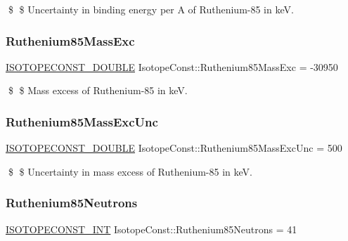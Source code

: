 \$ \$ Uncertainty in binding energy per A of Ruthenium-\/85 in keV. \mbox{\label{group___isotope_const-_ruthenium-_ru85_ga09f80bce7ae7cff043fea7841a4add67}} 
\subsubsection{\texorpdfstring{Ruthenium85\+Mass\+Exc}{Ruthenium85MassExc}}
{\footnotesize\ttfamily \mbox{\hyperlink{group___isotope_const-_macros_ga8f45a7272ce02c0b4c65c44636ed719a}{I\+S\+O\+T\+O\+P\+E\+C\+O\+N\+S\+T\+\_\+\+D\+O\+U\+B\+LE}} Isotope\+Const\+::\+Ruthenium85\+Mass\+Exc = -\/30950}

\$ \$ Mass excess of Ruthenium-\/85 in keV. \mbox{\label{group___isotope_const-_ruthenium-_ru85_gac74b7528a37d8be6b3b43e49d17b25d5}} 
\subsubsection{\texorpdfstring{Ruthenium85\+Mass\+Exc\+Unc}{Ruthenium85MassExcUnc}}
{\footnotesize\ttfamily \mbox{\hyperlink{group___isotope_const-_macros_ga8f45a7272ce02c0b4c65c44636ed719a}{I\+S\+O\+T\+O\+P\+E\+C\+O\+N\+S\+T\+\_\+\+D\+O\+U\+B\+LE}} Isotope\+Const\+::\+Ruthenium85\+Mass\+Exc\+Unc = 500}

\$ \$ Uncertainty in mass excess of Ruthenium-\/85 in keV. \mbox{\label{group___isotope_const-_ruthenium-_ru85_ga9aafdeb97b5dbe85973ab2c998704cee}} 
\subsubsection{\texorpdfstring{Ruthenium85\+Neutrons}{Ruthenium85Neutrons}}
{\footnotesize\ttfamily \mbox{\hyperlink{group___isotope_const-_macros_ga5f18360b3e99483a35c32d789e62621c}{I\+S\+O\+T\+O\+P\+E\+C\+O\+N\+S\+T\+\_\+\+I\+NT}} Isotope\+Const\+::\+Ruthenium85\+Neutrons = 41}

